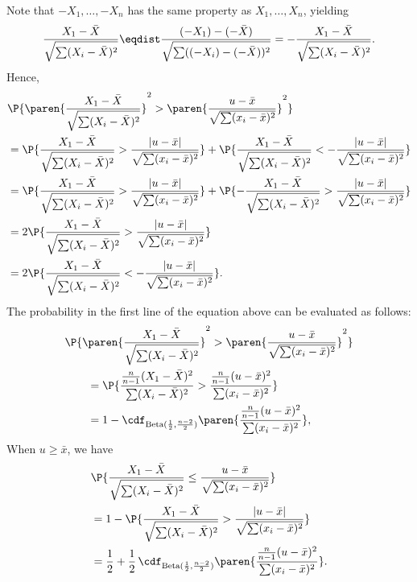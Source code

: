 \documentclass{homework}
\begin{document}
{Note that $-X_1,\dots,-X_n$ has the same property as $X_1,\dots,X_n$, yielding
\begin{align*}
    \frac{X_1 - \bar X}{\sqrt{\sum (X_i - \bar X)^2}} \eqdist \frac{(-X_1) - (-\bar X)}{\sqrt{\sum ((-X_i) - (-\bar X))^2}} = -\frac{X_1 - \bar X}{\sqrt{\sum (X_i - \bar X)^2}}.
\end{align*}
Hence,
\begin{align*}
     & \P{\paren{\frac{X_1 - \bar X}{\sqrt{\sum (X_i - \bar X)^2}}}^2 > \paren{\frac{u - \bar x}{\sqrt{\sum (x_i - \bar x)^2}}}^2}
    \\ &= \P{ \frac{X_1 - \bar X}{\sqrt{\sum (X_i - \bar X)^2}} > \frac{|u - \bar x|}{\sqrt{\sum (x_i - \bar x)^2} }} + \P{ \frac{X_1 - \bar X}{\sqrt{\sum (X_i - \bar X)^2}} < -\frac{|u - \bar x|}{\sqrt{\sum (x_i - \bar x)^2} }}
    \\ &= \P{ \frac{X_1 - \bar X}{\sqrt{\sum (X_i - \bar X)^2}} > \frac{|u - \bar x|}{\sqrt{\sum (x_i - \bar x)^2} }} + \P{ -\frac{X_1 - \bar X}{\sqrt{\sum (X_i - \bar X)^2}} > \frac{|u - \bar x|}{\sqrt{\sum (x_i - \bar x)^2} }}
    \\ &= 2\P{ \frac{X_1 - \bar X}{\sqrt{\sum (X_i - \bar X)^2}} > \frac{|u - \bar x|}{\sqrt{\sum (x_i - \bar x)^2} }}
    \\ &= 2\P{ \frac{X_1 - \bar X}{\sqrt{\sum (X_i - \bar X)^2}} < -\frac{|u - \bar x|}{\sqrt{\sum (x_i - \bar x)^2} }}.
\end{align*}
The probability in the first line of the equation above can be evaluated as follows:
\begin{align*}
     & \P{\paren{\frac{X_1 - \bar X}{\sqrt{\sum (X_i - \bar X)^2}}}^2 > \paren{\frac{u - \bar x}{\sqrt{\sum (x_i - \bar x)^2}}}^2}
    \\ &\qquad = \P{{\frac{\frac n {n-1}(X_1 - \bar X)^2}{{\sum (X_i - \bar X)^2}}}> {\frac{\frac n {n-1}(u - \bar x)^2}{{\sum (x_i - \bar x)^2}}}}
    \\ &\qquad = 1 - \cdf_{\text{Beta}(\frac 1 2, \frac {n-2}2)}\paren{\frac{\frac n {n-1}(u - \bar x)^2}{{\sum (x_i - \bar x)^2}}},
\end{align*}
When $u\ge \bar x$, we have
\begin{align*}
     & \P{ \frac{X_1 - \bar X}{\sqrt{\sum (X_i - \bar X)^2}} \le \frac{u - \bar x}{\sqrt{\sum (x_i - \bar x)^2} }}
    \\ &= 1 - \P{ \frac{X_1 - \bar X}{\sqrt{\sum (X_i - \bar X)^2}} > \frac{|u - \bar x|}{\sqrt{\sum (x_i - \bar x)^2} }}
    \\ &= \frac 12 + \frac 12\, \cdf_{\text{Beta}(\frac 1 2, \frac {n-2}2)}\paren{\frac{\frac n {n-1}(u - \bar x)^2}{{\sum (x_i - \bar x)^2}}}.

\end{align*}}
\end{document}
